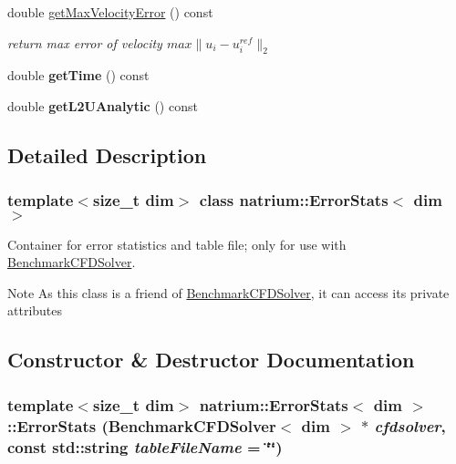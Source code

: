 \begin{DoxyCompactItemize}
\item 
\hypertarget{classnatrium_1_1ErrorStats_a48ea1bfc5db4dad6369b4b2991aa1f5c}{
double \hyperlink{classnatrium_1_1ErrorStats_a48ea1bfc5db4dad6369b4b2991aa1f5c}{getMaxVelocityError} () const }
\label{classnatrium_1_1ErrorStats_a48ea1bfc5db4dad6369b4b2991aa1f5c}

\begin{DoxyCompactList}\small\item\em return max error of velocity $ max \|u_{i} - u_{i}^{ref}\|_{2} $ \item\end{DoxyCompactList}\item 
\hypertarget{classnatrium_1_1ErrorStats_aa79b49d872935e567c94a2727af24dea}{
double {\bfseries getTime} () const }
\label{classnatrium_1_1ErrorStats_aa79b49d872935e567c94a2727af24dea}

\item 
\hypertarget{classnatrium_1_1ErrorStats_a965b8a50d1f84d8962c995808c222799}{
double {\bfseries getL2UAnalytic} () const }
\label{classnatrium_1_1ErrorStats_a965b8a50d1f84d8962c995808c222799}

\end{DoxyCompactItemize}


\subsection{Detailed Description}
\subsubsection*{template$<$size\_\-t dim$>$ class natrium::ErrorStats$<$ dim $>$}

Container for error statistics and table file; only for use with \hyperlink{classnatrium_1_1BenchmarkCFDSolver}{BenchmarkCFDSolver}. \begin{DoxyNote}{Note}
As this class is a friend of \hyperlink{classnatrium_1_1BenchmarkCFDSolver}{BenchmarkCFDSolver}, it can access its private attributes 
\end{DoxyNote}


\subsection{Constructor \& Destructor Documentation}
\hypertarget{classnatrium_1_1ErrorStats_a1dcdc9cb0508c7f64a067efae4134754}{
\subsubsection[{ErrorStats}]{\setlength{\rightskip}{0pt plus 5cm}template$<$size\_\-t dim$>$ {\bf natrium::ErrorStats}$<$ dim $>$::{\bf ErrorStats} ({\bf BenchmarkCFDSolver}$<$ dim $>$ $\ast$ {\em cfdsolver}, \/  const std::string {\em tableFileName} = {\ttfamily \char`\"{}\char`\"{}})}}
\label{classnatrium_1_1ErrorStats_a1dcdc9cb0508c7f64a067efae4134754}


